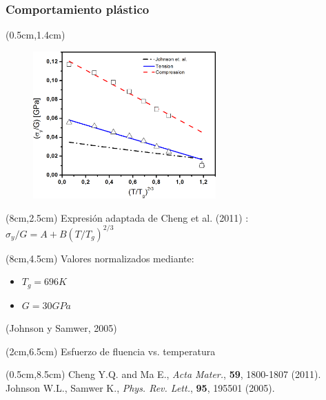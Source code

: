 \begin{frame}
 \frametitle{Comportamiento pl\'astico}
 \begin{textblock*}{7cm}(0.5cm,1.4cm)
  \begin{figure}[htp]
      \centering
      \includegraphics[width=7cm]{Presentacion_Mecom_2012/Fit2_Tercios.png}
  \end{figure}
 \end{textblock*}
 \begin{textblock*}{4.5cm}(8cm,2.5cm)
      Expresi\'on adaptada de Cheng et al. (2011) :\\
	$\sigma_y/G =A+B(T/T_g)^{2/3}$
  \end{textblock*}
  \begin{textblock*}{4.5cm}(8cm,4.5cm)
      Valores normalizados mediante:
      \begin{itemize}
       \item $T_g=696K$
       \item $G=30GPa$
      \end{itemize}
      \footnotesize{(Johnson y Samwer, 2005)}
  \end{textblock*}
  \begin{textblock*}{5cm}(2cm,6.5cm)
    \scriptsize{Esfuerzo de fluencia vs. temperatura}
  \end{textblock*}
  \begin{textblock*}{12cm}(0.5cm,8.5cm) %
    \scriptsize{Cheng Y.Q. and Ma E., \textit{Acta Mater.}, \textbf{59}, 1800-1807 (2011).\\
    Johnson W.L., Samwer K., \textit{Phys. Rev. Lett.}, \textbf{95}, 195501 (2005).}
  \end{textblock*}
\end{frame}

